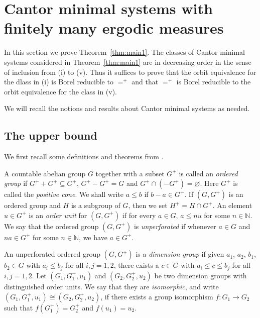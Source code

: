 \documentclass{amsart}
\theoremstyle{definition}
\theoremstyle{problem}
\theoremstyle{remark}
\numberwithin{equation}{section}
\begin{document}
\section{Cantor minimal systems with finitely many ergodic measures\label{sec:3}}

In this section we prove Theorem~\ref{thm:main1}.  The classes of Cantor minimal systems considered in Theorem~\ref{thm:main1} are in decreasing order in the sense of inclusion from (i) to (v). Thus it suffices to prove that the orbit equivalence for the dlass in (i) is Borel reducible to $=^+$ and that $=^+$ is Borel reducible to the orbit equivalence for the class in (v). 


We will recall the notions and results about Cantor minimal systems as needed. 


\subsection{The upper bound}
We first recall some definitions and theorems from \cite{GPS}. 


A countable abelian group $G$ together with a subset $G^+$ is called an {\em ordered group} if  $G^++G^+\subseteq G^+$, $G^+-G^+=G$ and $G^+\cap (-G^+)=\varnothing$. Here $G^+$ is called the {\em positive cone}. We shall write $a \le b$ if $b - a \in G^+$. If $(G, G^+)$ is an ordered group and $H$ is a subgroup of $G$, then we set $H^+=H\cap G^+$. An element $u \in G^+$ is  an  {\em order unit} for $(G,G^+)$ if  for every $a \in G$,  $a \le  nu$ for some $n \in \mathbb N$.  We say that the ordered group $(G,G^+)$ is {\em unperforated} if whenever $a\in G$ and $na\in G^+$ for some $n \in \mathbb N$, we have $a\in G^+$.  

An unperforated ordered group $(G,G^+)$ is a {\em dimension group} if given $a_1$,  $a_2$,  $b_1$,  $b_2 \in G$ with $a_i \le b_j$ for all $i, j =1, 2$, there exists a $c\in G$ with $a_i\le c \le b_j$ for all $i, j =1, 2$.   Let $(G_1, G_1^+, u_1)$ and $(G_2, G_2^+, u_2)$  be  two dimension groups  with distinguished order units.  We say that they are {\em isomorphic}, and write $(G_1, G_1^+, u_1)\cong (G_2, G_2^+, u_2)$, if there exists a group isomorphism $f\colon G_1 \to G_2$  such that  $f(G_1^+)=G_2^+$ and $f(u_1)=u_2$. 
\end{document}
